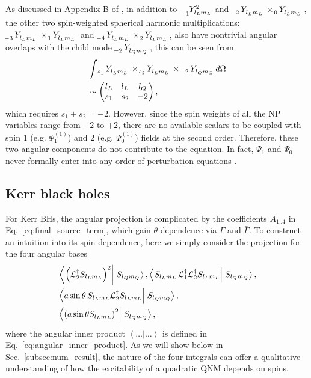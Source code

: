 \documentclass[aps,prd,amsmath,floats,floatfix, twocolumn,
superscriptaddress,nofootinbib,showpacs]{revtex4-1}
\begin{document}
As discussed in Appendix B of  \cite{Lagos:2022otp}, in addition to $\tensor[_{-1}]{{Y^2_{l_Lm_L}}}{}$ and $\tensor[_{-2}]{Y}{_{l_Lm_L}}\times\tensor[_{0}]{Y}{_{l_Lm_L}}$, the other two spin-weighted spherical harmonic multiplications: $\tensor[_{-3}]{Y}{_{l_Lm_L}}\times\tensor[_{1}]{Y}{_{l_Lm_L}}$ and $\tensor[_{-4}]{Y}{_{l_Lm_L}}\times\tensor[_{2}]{Y}{_{l_Lm_L}}$, also have nontrivial angular overlaps with the child mode $\tensor[_{-2}]{Y}{_{l_Qm_Q}}$, this can be seen from
\begin{align}
    &\int \tensor[_{s_1}]{Y}{_{l_Lm_L}}\times\tensor[_{s_2}]{Y}{_{l_Lm_L}}\times\tensor[_{-2}]{\bar{Y}}{_{l_Qm_Q}}   d\Omega \notag \\
    &\sim 
    \begin{pmatrix}
        l_L & l_L & l_Q \\
        s_1 & s_2 & -2
    \end{pmatrix},
\end{align}
which requires $s_1+s_2=-2$. However, since the spin weights of all the NP variables range from $-2$ to $+2$, there are no available scalars to be coupled with spin 1 (e.g. $\Psi_1^{(1)}$) and 2 (e.g. $\Psi_0^{(1)}$) fields at the second order. Therefore, these two angular components do not contribute to the equation. In fact, $\Psi_1$ and $\Psi_0$ never formally enter into any order of perturbation equations \cite{Campanelli:1998jv}. 

\subsection{Kerr black holes}
\label{subsec:angular_projection_Kerr_BH}
For Kerr BHs, the angular projection is complicated by the coefficients $A_{1..4}$ in Eq.~\eqref{eq:final_source_term}, which gain $\theta$-dependence via $\Gamma$ and $\bar{\Gamma}$. To construct an intuition into its spin dependence, here we simply consider the projection for the four angular bases
\begin{align}
    &\left<\left(\mathcal{L}_2^\dagger S_{l_Lm_L}\right)^2\right|\left.S_{l_{Q}m_Q}\right>,  \left<S_{l_Lm_L}\,\mathcal{L}_1^\dagger\mathcal{L}_2^\dagger S_{l_Lm_L}\right|\left.S_{l_{Q}m_Q}\right>, \notag \\
    &\left<a\sin\theta\,S_{l_Lm_L} \mathcal{L}_2^\dagger S_{l_Lm_L}\right|\left.S_{l_{Q}m_Q}\right>,  \notag \\
    &\left<\left(a\sin\theta S_{l_Lm_L}\right)^2\right|\left.S_{l_{Q}m_Q}\right>, \label{eq:four_angular_projections_kerr}
\end{align}
where the angular inner product $\left<\ldots\right|\left.\ldots\right>$ is defined in Eq.~\eqref{eq:angular_inner_product}.
As we will show below in Sec.~\ref{subsec:num_result}, the nature of the four integrals can offer a qualitative understanding of how the excitability of a quadratic QNM depends on spins.
\end{document}
